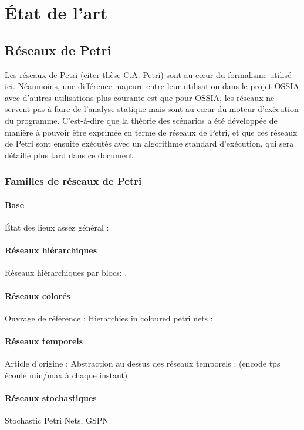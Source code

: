 \chapter{État de l'art}

\section{Réseaux de Petri}
Les réseaux de Petri (citer thèse C.A. Petri) sont au cœur du formalisme utilisé ici. Néanmoins, une différence majeure entre leur utilisation dans le projet \ac{OSSIA} avec d'autres utilisations plus courante est que pour \ac{OSSIA}, les réseaux ne servent pas à faire de l'analyse statique mais sont au cœur du moteur d'exécution du programme. C'est-à-dire que la théorie des scénarios a été développée de manière à pouvoir être exprimée en terme de réseaux de Petri, et que ces réseaux de Petri sont ensuite exécutés avec un algorithme standard d'exécution, qui sera détaillé plus tard dans ce document.

\subsection{Familles de réseaux de Petri}
\subsubsection{Base}
État des lieux assez général : \cite{david2010discrete}
\subsubsection{Réseaux hiérarchiques}
Réseaux hiérarchiques par blocs:  \cite{fehling1993concept}.
\subsubsection{Réseaux colorés}
Ouvrage de référence : \cite{jensen1987coloured}
Hierarchies in coloured petri nets : \cite{rozenberg1991advances}
\subsubsection{Réseaux temporels}
Article d'origine : \cite{suzuki1989temporal}
Abstraction au dessus des réseaux temporels : \cite{klai2013temporal} (encode tps écoulé min/max à chaque instant)
\subsubsection{Réseaux stochastiques}
Stochastic Petri Nets, GSPN
